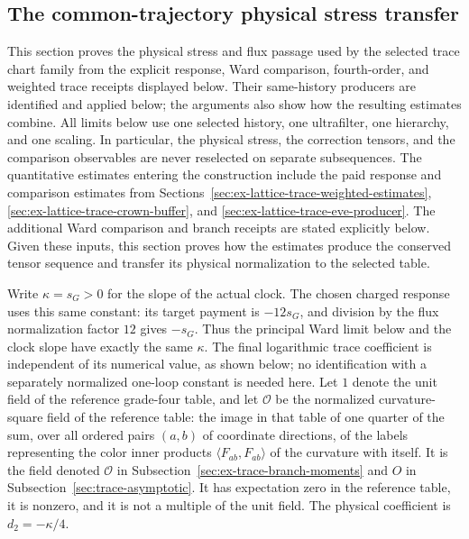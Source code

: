 \subsection{The common-trajectory physical stress transfer}
\label{sec:ex-lattice-trace-scribe-producer}

This section proves the physical stress and flux passage used by the
selected trace chart family from the explicit response, Ward comparison, fourth-order,
and weighted trace receipts displayed below. Their same-history producers are identified and applied below; the
arguments also show how the resulting estimates combine. All limits below use one selected history, one
ultrafilter, one hierarchy, and one scaling. In particular, the physical
stress, the correction tensors, and the comparison observables are never
reselected on separate subsequences. The quantitative estimates entering the
construction include the paid response and comparison estimates from
Sections~\ref{sec:ex-lattice-trace-weighted-estimates},
\ref{sec:ex-lattice-trace-crown-buffer}, and
\ref{sec:ex-lattice-trace-eve-producer}. The additional Ward comparison and branch
receipts are stated explicitly below. Given these inputs, this section proves
how the estimates produce the conserved tensor sequence and transfer its
physical normalization to the selected table.

Write $\kappa=s_G>0$ for the slope of the actual clock. The chosen
charged response uses this same constant: its target payment is
$-12s_G$, and division by the flux normalization factor $12$ gives
$-s_G$. Thus the principal Ward limit below and the clock slope have
exactly the same $\kappa$. The final logarithmic trace coefficient is
independent of its numerical value, as shown below; no identification
with a separately normalized one-loop constant is needed here. Let $1$ denote the unit
field of the reference grade-four table, and let $\mathcal O$ be the
normalized curvature-square field of the reference table: the image in
that table of one quarter of the sum, over all ordered pairs $(a,b)$ of
coordinate directions, of the labels representing the color inner
products $\langle F_{ab},F_{ab}\rangle$ of the curvature with itself. It is the field denoted
$\mathcal O$ in Subsection~\ref{sec:ex-trace-branch-moments} and $O$ in
Subsection~\ref{sec:trace-asymptotic}. It has expectation zero in the
reference table, it is nonzero, and it is not a multiple of the unit
field. The physical coefficient is $d_2=-\kappa/4$.

